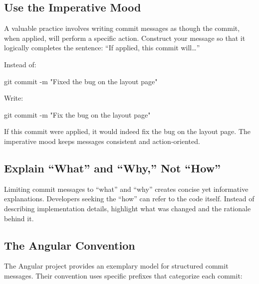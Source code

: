 \documentclass[
  letterpaper,
  DIV=11,
  numbers=noendperiod]{scrartcl}
\newenvironment{Shaded}{\begin{snugshade}}{\end{snugshade}}
\newcommand{\AttributeTok}[1]{\textcolor[rgb]{0.40,0.45,0.13}{#1}}
\newcommand{\FunctionTok}[1]{\textcolor[rgb]{0.28,0.35,0.67}{#1}}
\newcommand{\NormalTok}[1]{\textcolor[rgb]{0.00,0.23,0.31}{#1}}
\newcommand{\StringTok}[1]{\textcolor[rgb]{0.13,0.47,0.30}{#1}}
\begin{document}
\subsection{Use the Imperative Mood}\label{use-the-imperative-mood}

A valuable practice involves writing commit messages as though the
commit, when applied, will perform a specific action. Construct your
message so that it logically completes the sentence: ``If applied, this
commit will\ldots{}''

Instead of:

\begin{Shaded}
\begin{Highlighting}[]
\FunctionTok{git}\NormalTok{ commit }\AttributeTok{{-}m} \StringTok{"Fixed the bug on the layout page"}
\end{Highlighting}
\end{Shaded}

Write:

\begin{Shaded}
\begin{Highlighting}[]
\FunctionTok{git}\NormalTok{ commit }\AttributeTok{{-}m} \StringTok{"Fix the bug on the layout page"}
\end{Highlighting}
\end{Shaded}

If this commit were applied, it would indeed fix the bug on the layout
page. The imperative mood keeps messages consistent and action-oriented.

\subsection{Explain ``What'' and ``Why,'' Not
``How''}\label{explain-what-and-why-not-how}

Limiting commit messages to ``what'' and ``why'' creates concise yet
informative explanations. Developers seeking the ``how'' can refer to
the code itself. Instead of describing implementation details, highlight
what was changed and the rationale behind it.

\subsection{The Angular Convention}\label{the-angular-convention}

The Angular project provides an exemplary model for structured commit
messages. Their convention uses specific prefixes that categorize each
commit:
\end{document}
